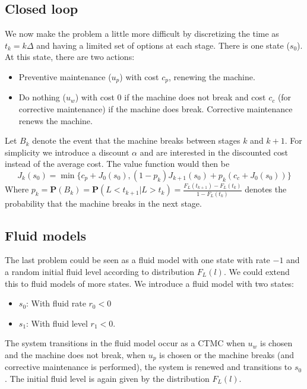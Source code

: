 \subsection{Closed loop}
We now make the problem a little more difficult by discretizing the time as $t_k=k\Delta$ and having a limited set of options at each stage.
There is one state ($s_0$). At this state, there are two actions:
\begin{itemize}
\item Preventive maintenance ($u_p$) with cost $c_p$, renewing the machine.
\item Do nothing ($u_w$) with cost 0 if the machine does not break and cost $c_c$ (for corrective maintenance) if the machine does break. Corrective maintenance renews the machine.
\end{itemize}
Let $B_k$ denote the event that the machine breaks between stages $k$ and $k+1$. For simplicity we introduce a discount $\alpha$ and are interested in the discounted cost instead of the average cost. The value function would then be 
$$
J_{k}(s_0)=\min\{c_p+ J_0(s_0),(1-p_k) J_{k+1}(s_0)+p_k(c_c+ J_0(s_0))\}
$$
Where $p_k=\mathbf{P}(B_k)=\mathbf{P}(L<t_{k+1}|L>t_k)=\frac{F_L(t_{k+1})-F_L(t_k)}{1-F_L(t_k)}$ denotes the probability that the machine breaks in the next stage.

\subsection{Fluid models}
The last problem could be seen as a fluid model with one state with rate $-1$ and a random initial fluid level according to distribution $F_L(l)$. We could extend this to fluid models of more states.
We introduce a fluid model with two states: 
\begin{itemize}
\item $s_0$: With fluid rate $r_0<0$
\item $s_1$: With fluid level $r_1<0$.
\end{itemize}
The system transitions in the fluid model occur as a CTMC when $u_w$ is chosen and the machine does not break, when $u_p$ is chosen or the machine breaks (and corrective maintenance is performed), the system is renewed and transitions to $s_0$. The initial fluid level is again given by the distribution $F_L(l)$.\\

